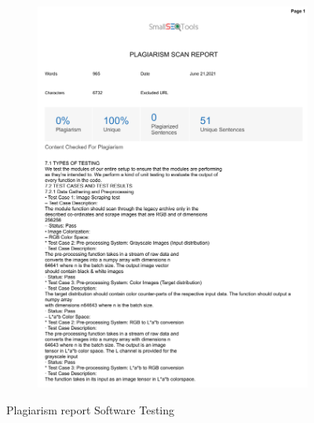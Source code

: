 \documentclass[oneside,a4paper,12pt]{report}
\begin{document}
\begin{appendices}
\begin{figure}
	\begin{subfigure}[H]{\textwidth}
		\centering
    	\includegraphics[scale=0.7, page=1]{plagiarism/software_testing.pdf}
    \end{subfigure}
 \caption{Plagiarism report Software Testing}
    \label{PlagiarismSoftwareTesting}
\end{figure}
\begin{figure}\ContinuedFloat
    \begin{subfigure}[H]{\textwidth}
    	\centering

\end{subfigure}
\end{figure}
\end{appendices}
\end{document}
